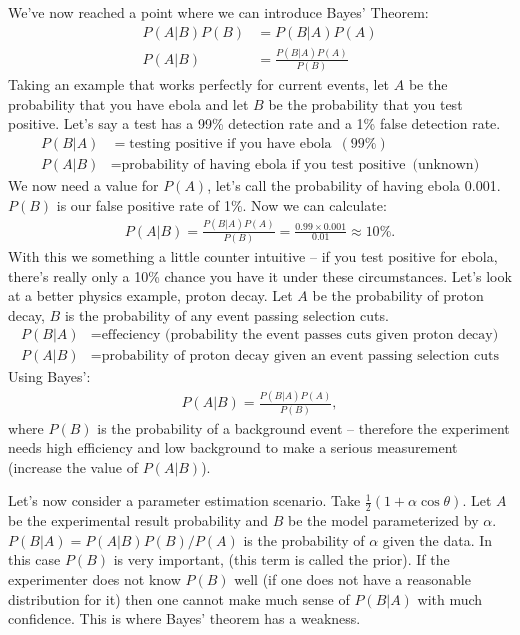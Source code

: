 \documentclass{article}
\begin{document}
\noindent We've now reached a point where we can introduce Bayes' Theorem:
\begin{align}
  P(A|B)P(B) & = P(B|A)P(A)                                                               \\
  P(A|B)     & = \frac{P(B|A)P(A)}{P(B)}
\end{align}
Taking an example that works perfectly for current events, let $A$ be the probability that you have ebola and let $B$ be the probability that you test positive. Let's say a test has a 99\% detection rate and a 1\% false detection rate.
\begin{align*}
  P(B|A)     & = \text{testing positive if you have ebola }\, (99\%)                      \\
  P(A|B)     & = \text{probability of having ebola if you test positive }\, \text{(unknown)}
\end{align*}
We now need a value for $P(A)$, let's call the probability of having ebola 0.001. $P(B)$ is our false positive rate of 1\%. Now we can calculate:
\begin{align*}
  P(A|B) = \frac{P(B|A)P(A)}{P(B)} = \frac{0.99 \times 0.001}{0.01} \approx 10\%.
\end{align*}
With this we something a little counter intuitive -- if you test positive for ebola, there's really only a 10\% chance you have it under these circumstances. Let's look at a better physics example, proton decay. Let $A$ be the probability of proton decay, $B$ is the probability of any event passing selection cuts.
\begin{align*}
  P(B|A)     & = \text{effeciency (probability the event passes cuts given proton decay)} \\
  P(A|B)     & = \text{probability of proton decay given an event passing selection cuts}
\end{align*}
Using Bayes':
\begin{align}
  P(A|B) = \frac{P(B|A)P(A)}{P(B)},
\end{align}
where $P(B)$ is the probability of a background event -- therefore the experiment needs high efficiency and low background to make a serious measurement (increase the value of $P(A|B)$).

\noindent Let's now consider a parameter estimation scenario. Take $\frac{1}{2}(1+\alpha\cos\theta)$. Let $A$ be the experimental result probability and $B$ be the model parameterized by $\alpha$. $P(B|A) = P(A|B)P(B)/P(A)$ is the probability of $\alpha$ given the data. In this case $P(B)$ is very important, (this term is called the prior). If the experimenter does not know $P(B)$ well (if one does not have a reasonable distribution for it) then one cannot make much sense of $P(B|A)$ with much confidence. This is where Bayes' theorem has a weakness.
\end{document}
